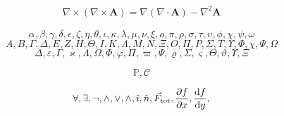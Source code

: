 \documentclass[presentatie.tex]{subfiles}
\begin{document}
\begin{frame}
	
	\begin{align*}
		\nabla\times(\nabla\times\mathbf{A}) = \nabla(\nabla\cdot \mathbf{A}) - \nabla^2\mathbf{A}
	\end{align*}
\end{frame}

\begin{frame}
	
	\begin{equation*}
		\alpha,\beta,\gamma,\delta,\epsilon,\zeta,\eta,\theta,\iota,\kappa,\lambda,
		\mu,\nu,\xi,o,\pi,\rho,\sigma,\tau,\upsilon,\phi,\chi,\psi,\omega
	\end{equation*}
	\begin{equation*}
		A,B,\Gamma,\Delta,E,Z,H,\Theta,I,K,\Lambda,
		M,N,\Xi,O,\Pi,P,\Sigma,T,\Upsilon,\Phi,\chi,\Psi,\Omega
	\end{equation*}
	\begin{equation*}
		\varDelta,\varepsilon,\varGamma,\varkappa,\varLambda,%
		\varOmega,\varPhi,\varphi,\varPi,\varpi,%
		\varPsi,\varrho,
		\varSigma,\varsigma,\varTheta,\vartheta,%
		\varUpsilon,\varXi
	\end{equation*}

	
	\begin{equation}
		\mathbb{P}, \mathcal{C}
	\end{equation}
	
	\begin{equation}
		\forall, \exists, \lnot, \land, \lor, \wedge, \hat{\imath}, \hat{n}, \vec{F}_{\text{tot}},
		\frac{\partial f}{\partial x}, \frac{\dif f}{\dif y}, %
	\end{equation}
\end{frame}
\end{document}
